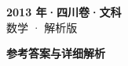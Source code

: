 \documentclass[zihao=-4, a4paper]{ctexart}
\begin{document}
\begin{center}
  {\Large\bfseries 2013 年·四川卷·文科}\\[4pt]
  {\large 数学 · 解析版}
\end{center}
\medskip
{}

\clearpage
{}
\begin{center}{\Large\bfseries 参考答案与详细解析}\end{center}
\medskip

\end{document}
